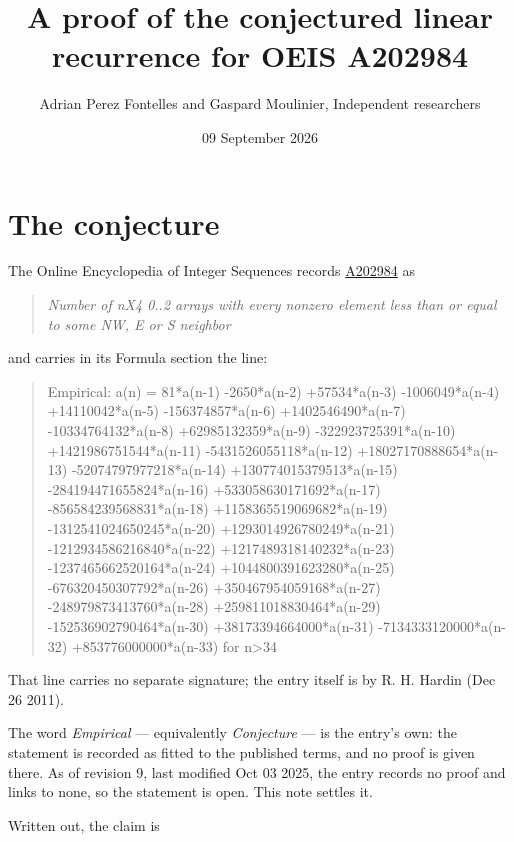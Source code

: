 \documentclass[11pt]{article}
\title{A proof of the conjectured linear recurrence for OEIS A202984}
\author{Adrian Perez Fontelles and Gaspard Moulinier, Independent researchers}
\date{09 September 2026}
\theoremstyle{definition}
\begin{document}
\maketitle
\section{The conjecture}

The Online Encyclopedia of Integer Sequences records \href{https://oeis.org/A202984}{A202984} as

\begin{quote}\itshape Number of nX4 0..2 arrays with every nonzero element less than or equal to some NW, E or S neighbor\end{quote}

and carries in its Formula section the line:

\begin{quote}\ttfamily Empirical: a(n) = 81*a(n-1) -2650*a(n-2) +57534*a(n-3) -1006049*a(n-4) +14110042*a(n-5) -156374857*a(n-6) +1402546490*a(n-7) -10334764132*a(n-8) +62985132359*a(n-9) -322923725391*a(n-10) +1421986751544*a(n-11) -5431526055118*a(n-12) +18027170888654*a(n-13) -52074797977218*a(n-14) +130774015379513*a(n-15) -284194471655824*a(n-16) +533058630171692*a(n-17) -856584239568831*a(n-18) +1158365519069682*a(n-19) -1312541024650245*a(n-20) +1293014926780249*a(n-21) -1212934586216840*a(n-22) +1217489318140232*a(n-23) -1237465662520164*a(n-24) +1044800391623280*a(n-25) -676320450307792*a(n-26) +350467954059168*a(n-27) -248979873413760*a(n-28) +259811018830464*a(n-29) -152536902790464*a(n-30) +38173394664000*a(n-31) -7134333120000*a(n-32) +853776000000*a(n-33) for n>34\end{quote}

That line carries no separate signature; the entry itself is by R. H. Hardin (Dec 26 2011).

The word {\itshape Empirical} --- equivalently {\itshape Conjecture} --- is the entry's own: the statement is recorded as fitted to the published terms, and no proof is given there. As of revision 9, last modified Oct 03 2025, the entry records no proof and links to none, so the statement is open. This note settles it.

Written out, the claim is
\end{document}
